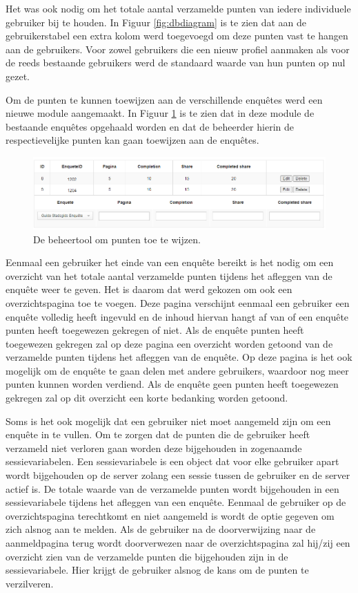 Het was ook nodig om het totale aantal verzamelde punten van iedere individuele gebruiker bij te houden. In Figuur \ref{fig:dbdiagram} is te zien dat aan de gebruikerstabel een extra kolom werd toegevoegd om deze punten vast te hangen aan de gebruikers. Voor zowel gebruikers die een nieuw profiel aanmaken als voor de reeds bestaande gebruikers werd de standaard waarde van hun punten op nul gezet.

Om de punten te kunnen toewijzen aan de verschillende enquêtes werd een nieuwe module aangemaakt. In Figuur \ref{fig:managepoints} is te zien dat in deze module de bestaande enquêtes opgehaald worden en dat de beheerder hierin de respectievelijke punten kan gaan toewijzen aan de enquêtes.

\begin{figure}
    \includegraphics[width=\linewidth]{ManagePoints.png}
    \caption{De beheertool om punten toe te wijzen.}
    \label{fig:managepoints}
\end{figure}

Eenmaal een gebruiker het einde van een enquête bereikt is het nodig om een overzicht van het totale aantal verzamelde punten tijdens het afleggen van de enquête weer te geven. Het is daarom dat werd gekozen om ook een overzichtspagina toe te voegen. Deze pagina verschijnt eenmaal een gebruiker een enquête volledig heeft ingevuld en de inhoud hiervan hangt af van of een enquête punten heeft toegewezen gekregen of niet. Als de enquête punten heeft toegewezen gekregen zal op deze pagina een overzicht worden getoond van de verzamelde punten tijdens het afleggen van de enquête. Op deze pagina is het ook mogelijk om de enquête te gaan delen met andere gebruikers, waardoor nog meer punten kunnen worden verdiend. Als de enquête geen punten heeft toegewezen gekregen zal op dit overzicht een korte bedanking worden getoond.

Soms is het ook mogelijk dat een gebruiker niet moet aangemeld zijn om een enquête in te vullen. Om te zorgen dat de punten die de gebruiker heeft verzameld niet verloren gaan worden deze bijgehouden in zogenaamde sessievariabelen. Een sessievariabele is een object dat voor elke gebruiker apart wordt bijgehouden op de server zolang een sessie tussen de gebruiker en de server actief is. De totale waarde van de verzamelde punten wordt bijgehouden in een sessievariabele tijdens het afleggen van een enquête. Eenmaal de gebruiker op de overzichtspagina terechtkomt en niet aangemeld is wordt de optie gegeven om zich alsnog aan te melden. Als de gebruiker na de doorverwijzing naar de aanmeldpagina terug wordt doorverwezen naar de overzichtspagina zal hij/zij een overzicht zien van de verzamelde punten die bijgehouden zijn in de sessievariabele. Hier krijgt de gebruiker alsnog de kans om de punten te verzilveren.

